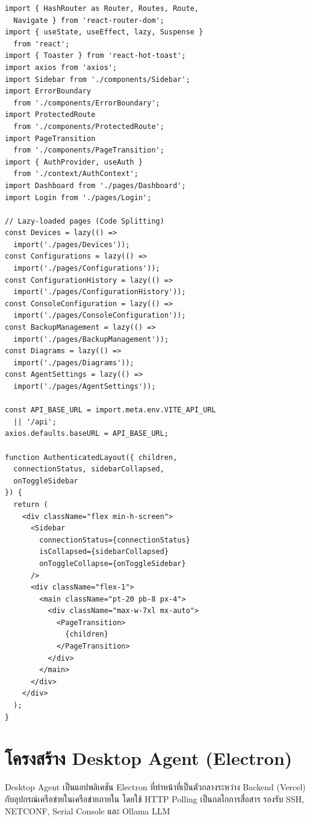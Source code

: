 \begin{lstlisting}[language=JSX, caption={frontend/src/App.jsx -- React Router และ Lazy Loading}]
import { HashRouter as Router, Routes, Route,
  Navigate } from 'react-router-dom';
import { useState, useEffect, lazy, Suspense }
  from 'react';
import { Toaster } from 'react-hot-toast';
import axios from 'axios';
import Sidebar from './components/Sidebar';
import ErrorBoundary
  from './components/ErrorBoundary';
import ProtectedRoute
  from './components/ProtectedRoute';
import PageTransition
  from './components/PageTransition';
import { AuthProvider, useAuth }
  from './context/AuthContext';
import Dashboard from './pages/Dashboard';
import Login from './pages/Login';

// Lazy-loaded pages (Code Splitting)
const Devices = lazy(() =>
  import('./pages/Devices'));
const Configurations = lazy(() =>
  import('./pages/Configurations'));
const ConfigurationHistory = lazy(() =>
  import('./pages/ConfigurationHistory'));
const ConsoleConfiguration = lazy(() =>
  import('./pages/ConsoleConfiguration'));
const BackupManagement = lazy(() =>
  import('./pages/BackupManagement'));
const Diagrams = lazy(() =>
  import('./pages/Diagrams'));
const AgentSettings = lazy(() =>
  import('./pages/AgentSettings'));

const API_BASE_URL = import.meta.env.VITE_API_URL
  || '/api';
axios.defaults.baseURL = API_BASE_URL;

function AuthenticatedLayout({ children,
  connectionStatus, sidebarCollapsed,
  onToggleSidebar
}) {
  return (
    <div className="flex min-h-screen">
      <Sidebar
        connectionStatus={connectionStatus}
        isCollapsed={sidebarCollapsed}
        onToggleCollapse={onToggleSidebar}
      />
      <div className="flex-1">
        <main className="pt-20 pb-8 px-4">
          <div className="max-w-7xl mx-auto">
            <PageTransition>
              {children}
            </PageTransition>
          </div>
        </main>
      </div>
    </div>
  );
}
\end{lstlisting}

\section{โครงสร้าง Desktop Agent (Electron)}

\hspace*{1.3em}
Desktop Agent เป็นแอปพลิเคชัน Electron ที่ทำหน้าที่เป็นตัวกลางระหว่าง Backend (Vercel) กับอุปกรณ์เครือข่ายในเครือข่ายภายใน โดยใช้ HTTP Polling เป็นกลไกการสื่อสาร รองรับ SSH, NETCONF, Serial Console และ Ollama LLM

